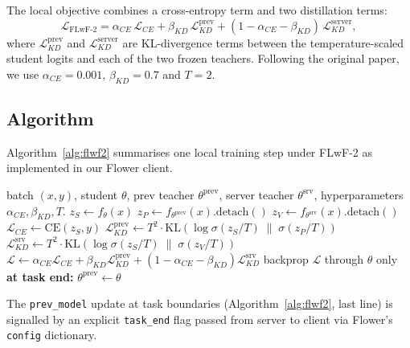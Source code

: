 \documentclass[journal]{IEEEtran}
\begin{document}
\noindent
The local objective combines a cross-entropy term and two distillation
terms:
\begin{equation}
\boxed{\;
\mathcal{L}_{\mathrm{FLwF\text{-}2}}
   = \alpha_{CE}\,\mathcal{L}_{CE}
   + \beta_{KD}\,\mathcal{L}_{KD}^{\text{prev}}
   + (1\!-\!\alpha_{CE}\!-\!\beta_{KD})\,
     \mathcal{L}_{KD}^{\text{server}},
\;}
\label{eq:flwf2-loss}
\end{equation}
where $\mathcal{L}_{KD}^{\text{prev}}$ and
$\mathcal{L}_{KD}^{\text{server}}$ are KL-divergence terms between the
temperature-scaled student logits and each of the two frozen teachers.
Following the original paper, we use $\alpha_{CE}{=}0.001$,
$\beta_{KD}{=}0.7$ and $T{=}2$.

\subsection{Algorithm}

Algorithm~\ref{alg:flwf2} summarises one local training step under
FLwF-2 as implemented in our Flower client.

\begin{algorithm}[t]
\caption{FLwF-2 local training (one batch).}
\label{alg:flwf2}
\begin{algorithmic}[1]
\REQUIRE batch $(x,y)$, student $\theta$, prev teacher $\theta^{\text{prev}}$, server teacher $\theta^{\text{srv}}$, hyperparameters $\alpha_{CE},\beta_{KD},T$.
\STATE $z_S \leftarrow f_\theta(x)$ 
\STATE $z_P \leftarrow f_{\theta^{\text{prev}}}(x).\mathrm{detach}()$
\STATE $z_V \leftarrow f_{\theta^{\text{srv}}}(x).\mathrm{detach}()$
\STATE $\mathcal{L}_{CE} \leftarrow \mathrm{CE}(z_S, y)$
\STATE $\mathcal{L}_{KD}^{\text{prev}} \leftarrow T^2 \cdot \mathrm{KL}\!\left(\log\sigma(z_S/T)\;\|\;\sigma(z_P/T)\right)$
\STATE $\mathcal{L}_{KD}^{\text{srv}}  \leftarrow T^2 \cdot \mathrm{KL}\!\left(\log\sigma(z_S/T)\;\|\;\sigma(z_V/T)\right)$
\STATE $\mathcal{L} \leftarrow \alpha_{CE}\mathcal{L}_{CE} + \beta_{KD}\mathcal{L}_{KD}^{\text{prev}} + (1{-}\alpha_{CE}{-}\beta_{KD})\mathcal{L}_{KD}^{\text{srv}}$
\STATE backprop $\mathcal{L}$ through $\theta$ only
\STATE \textbf{at task end:} $\theta^{\text{prev}} \leftarrow \theta$
\end{algorithmic}
\end{algorithm}

The \texttt{prev\_model} update at task boundaries (Algorithm~\ref{alg:flwf2},
last line) is signalled by an explicit \texttt{task\_end} flag passed
from server to client via Flower's \texttt{config} dictionary.
\end{document}
